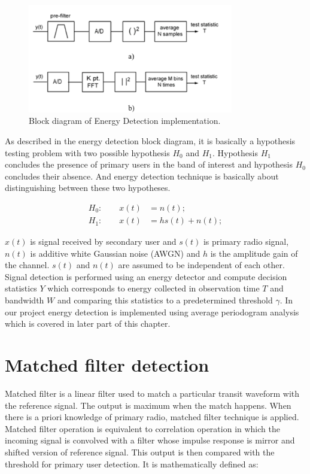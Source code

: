 \begin{figure}[h]
\centering
\includegraphics[width=0.8\textwidth]{../images/energyDetection}
\caption[Block diagram of Energy Detection implementatio]{Block diagram 
of Energy Detection implementation{\cite{cabric06}}.}
\label{energyDetection}
\end{figure}

As described in the energy detection block diagram, it is basically a hypothesis
testing problem with two possible hypothesis $H_0$ and $H_1$. Hypothesis $H_1$ concludes 
the presence of primary users in the band of interest and hypothesis $H_0$ 
concludes their absence. And energy detection technique is basically about 
distinguishing between these two hypotheses\cite{sarijari09}.


\begin{align}
  H_0: \qquad x(t) & = n(t);  \nonumber \\
  H_1: \qquad x(t) & = hs(t)+n(t);  \nonumber
\end{align}

$x(t)$ is signal received by secondary user and $s(t)$ is primary radio 
signal, $n(t)$ is additive white Gaussian noise (AWGN) and $h$ is the amplitude gain
of the channel. $s(t)$ and $n(t)$ are assumed to be independent of each other. 
Signal detection is performed using an energy detector and compute decision 
statistics $Y$ which corresponds to energy collected in observation time $T$ and 
bandwidth $W$ and comparing this statistics to a predetermined threshold
$\gamma$. In our project energy 
detection is implemented using average periodogram analysis which is covered in 
later part of this chapter.


\section{Matched filter detection}
Matched filter is a linear filter used to match a particular transit waveform 
with the reference signal. The output is maximum when the match happens. When 
there is a priori knowledge of primary radio, matched filter technique is 
applied. Matched filter operation is equivalent to correlation operation in 
which the incoming signal is convolved with a filter whose impulse response is 
mirror and shifted version of reference signal. This output is then compared 
with the threshold for primary user detection. It is mathematically defined as:


